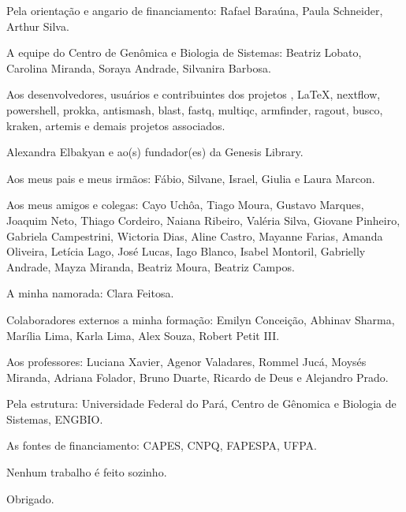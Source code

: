 \begin{agradecimentos}
\centering
Pela orientação e angario de financiamento: Rafael Baraúna, Paula Schneider, Arthur Silva. 

A equipe do Centro de Genômica e Biologia de Sistemas: Beatriz Lobato, Carolina Miranda, Soraya Andrade,
Silvanira Barbosa. 

Aos desenvolvedores, usuários e contribuintes dos projetos \abnTeX, \LaTeX, nextflow, powershell, 
prokka, antismash, blast, fastq, multiqc, armfinder, ragout, busco, kraken, artemis e demais projetos
associados.

Alexandra Elbakyan e ao(s) fundador(es) da Genesis Library.

Aos meus pais e meus irmãos: Fábio, Silvane, Israel, Giulia e Laura Marcon.

Aos meus amigos e colegas: Cayo Uchôa, Tiago Moura, Gustavo Marques, Joaquim Neto, Thiago Cordeiro, Naiana Ribeiro, 
Valéria Silva, Giovane Pinheiro, Gabriela Campestrini, Wictoria Dias, Aline Castro, Mayanne Farias, Amanda Oliveira, 
Letícia Lago, José Lucas, Iago Blanco, Isabel Montoril, Gabrielly Andrade, Mayza Miranda,
Beatriz Moura, Beatriz Campos. 

A minha namorada: Clara Feitosa.

Colaboradores externos a minha formação: Emilyn Conceição, Abhinav Sharma, Marília Lima, Karla Lima, Alex Souza, Robert Petit III.

Aos professores: Luciana Xavier, Agenor Valadares, Rommel Jucá, Moysés Miranda, Adriana Folador,
Bruno Duarte, Ricardo de Deus e Alejandro Prado.

Pela estrutura: Universidade Federal do Pará, Centro de Gênomica e Biologia de Sistemas, ENGBIO.

As fontes de financiamento: CAPES, CNPQ, FAPESPA, UFPA.


Nenhum trabalho é feito sozinho.


Obrigado.

\end{agradecimentos}
